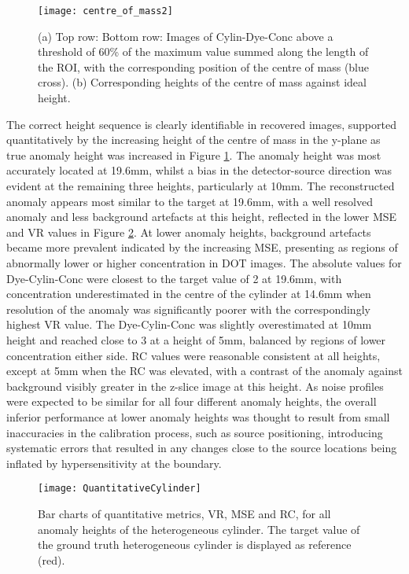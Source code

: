 \documentclass[twoside]{bhamthesis}
\theoremstyle{definition}
\begin{document}
\begin{figure}[!ht]
\centering
  \texttt{[image: centre\_of\_mass2]}
  \caption{(a) Top row: Bottom row: Images of Cylin-Dye-Conc above a threshold of 60\% of the maximum value summed along the length of the ROI, with the corresponding position of the centre of mass (blue cross). (b) Corresponding heights of the centre of mass against ideal height.}
    \label{fig:centre_of_mass2}
\end{figure}

The correct height sequence is clearly identifiable in recovered images, supported quantitatively by the increasing height of the centre of mass in the y-plane as true anomaly height was increased in Figure \ref{fig:centre_of_mass2}. The anomaly height was most accurately located at 19.6mm, whilst a bias in the detector-source direction was evident at the remaining three heights, particularly at 10mm. The reconstructed anomaly appears most similar to the target at 19.6mm, with a well resolved anomaly and less background artefacts at this height, reflected in the lower MSE and VR values in Figure \ref{fig:QuantitativeCylinder}. At lower anomaly heights, background artefacts became more prevalent indicated by the increasing MSE, presenting as regions of abnormally lower or higher concentration in DOT images. The absolute values for Dye-Cylin-Conc were closest to the target value of 2 at 19.6mm, with concentration underestimated in the centre of the cylinder at 14.6mm when resolution of the anomaly was significantly poorer with the correspondingly highest VR value. The Dye-Cylin-Conc was slightly overestimated at 10mm height and reached close to 3 at a height of 5mm, balanced by regions of lower concentration either side. RC values were reasonable consistent at all heights, except at 5mm when the RC was elevated, with a contrast of the anomaly against background visibly greater in the z-slice image at this height. As noise profiles were expected to be similar for all four different anomaly heights, the overall inferior performance at lower anomaly heights was thought to result from small inaccuracies in the calibration process, such as source positioning, introducing systematic errors that resulted in any changes close to the source locations being inflated by hypersensitivity at the boundary.

\begin{figure}[!ht]
\centering
  \texttt{[image: QuantitativeCylinder]}
  \caption{Bar charts of quantitative metrics, VR, MSE and RC, for all anomaly heights of the heterogeneous cylinder. The target value of the ground truth heterogeneous cylinder is displayed as reference (red).}
    \label{fig:QuantitativeCylinder}
\end{figure}
\end{document}

